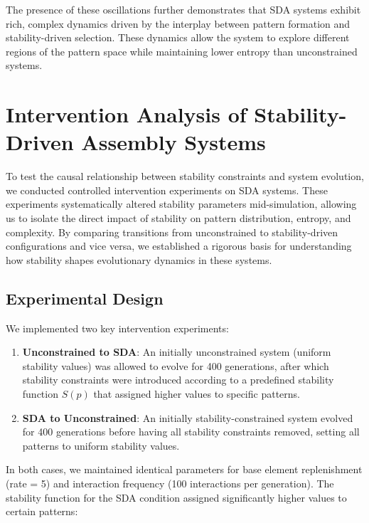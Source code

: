 \documentclass[preprint,12pt]{elsarticle}
\begin{document}
The presence of these oscillations further demonstrates that SDA systems exhibit rich, complex dynamics driven by the interplay between pattern formation and stability-driven selection. These dynamics allow the system to explore different regions of the pattern space while maintaining lower entropy than unconstrained systems.

\section{Intervention Analysis of Stability-Driven Assembly Systems}

To test the causal relationship between stability constraints and system evolution, we conducted controlled intervention experiments on SDA systems. These experiments systematically altered stability parameters mid-simulation, allowing us to isolate the direct impact of stability on pattern distribution, entropy, and complexity. By comparing transitions from unconstrained to stability-driven configurations and vice versa, we established a rigorous basis for understanding how stability shapes evolutionary dynamics in these systems.

\subsection{Experimental Design}

We implemented two key intervention experiments:

\begin{enumerate}
    \item \textbf{Unconstrained to SDA}: An initially unconstrained system (uniform stability values) was allowed to evolve for 400 generations, after which stability constraints were introduced according to a predefined stability function $S(p)$ that assigned higher values to specific patterns.
    
    \item \textbf{SDA to Unconstrained}: An initially stability-constrained system evolved for 400 generations before having all stability constraints removed, setting all patterns to uniform stability values.
\end{enumerate}

In both cases, we maintained identical parameters for base element replenishment (rate = 5) and interaction frequency (100 interactions per generation). The stability function for the SDA condition assigned significantly higher values to certain patterns:
\end{document}
